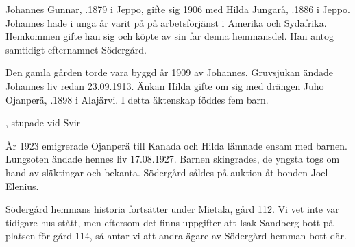 Johannes Gunnar, .1879 i Jeppo, gifte sig 1906 med Hilda Jungarå, .1886 i Jeppo. Johannes hade i unga år varit på på arbetsförjänst i Amerika och Sydafrika. Hemkommen gifte han sig och köpte av sin far denna hemmansdel. Han antog samtidigt efternamnet Södergård.
\begin{jhchildren}
  \item {}
  \item {}
  \item {}
  \item {}
\end{jhchildren}

Den gamla gården torde vara byggd år 1909 av Johannes. Gruvsjukan ändade Johannes liv redan 23.09.1913. Änkan Hilda gifte om sig med drängen Juho Ojanperä, .1898 i Alajärvi. I detta äktenskap föddes fem barn.
\begin{jhchildren}
  \item {}
  \item {}
  \item {}
  \item {}, stupade vid Svir
  \item {}
\end{jhchildren}
År 1923 emigrerade Ojanperä till Kanada och Hilda lämnade ensam med barnen. Lungsoten ändade hennes liv 17.08.1927. Barnen skingrades, de yngsta togs om hand av släktingar och bekanta. Södergård såldes på auktion åt bonden Joel Elenius.

Södergård hemmans historia fortsätter under Mietala, gård 112. Vi vet inte var tidigare hus stått, men eftersom det finns uppgifter att Isak Sandberg bott på platsen för gård 114, så antar vi att andra ägare av Södergård hemman bott där.
